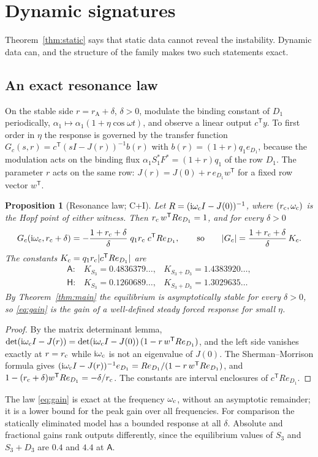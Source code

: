 \documentclass[11pt,a4paper]{article}
\theoremstyle{plain}
\newtheorem{proposition}[theorem]{Proposition}
\theoremstyle{definition}
\theoremstyle{remark}
\newcommand{\ii}{\mathrm i}
\newcommand{\T}{\mathsf T}
\newcommand{\rA}{r_{\mathrm A}}
\newcommand{\WA}{\mathsf A}
\newcommand{\WH}{\mathsf H}
\newcommand{\evC}{\textsf{C}}
\newcommand{\evI}{\textsf{I}}
\begin{document}
\section{Dynamic signatures}\label{sec:measure}
Theorem~\ref{thm:static} says that static data cannot reveal the instability. Dynamic data can, and the structure of the family makes two such statements exact.

\subsection{An exact resonance law}
On the stable side $r=\rA+\delta$, $\delta>0$, modulate the binding constant of $D_1$ periodically, $\alpha_1\mapsto\alpha_1(1+\eta\cos\omega t)$, and observe a linear output $c^{\T}y$. To first order in $\eta$ the response is governed by the transfer function $G_c(s,r)=c^{\T}(sI-J(r))^{-1}b(r)$ with $b(r)=(1+r)q_1e_{D_1}$, because the modulation acts on the binding flux $\alpha_1S_1^*F^*=(1+r)q_1$ of the row $D_1$. The parameter $r$ acts on the same row: $J(r)=J(0)+r\,e_{D_1}w^{\T}$ for a fixed row vector $w^{\T}$.

\begin{proposition}[Resonance law; \evC+\evI]\label{prop:gain}
Let $R=(\ii\omega_{\rm c}I-J(0))^{-1}$, where $(r_{\rm c},\omega_{\rm c})$ is the Hopf point of either witness. Then $r_{\rm c}\,w^{\T}Re_{D_1}=1$, and for every $\delta>0$
\begin{equation}\label{eq:gain}
 G_c(\ii\omega_{\rm c},r_{\rm c}+\delta)=-\frac{1+r_{\rm c}+\delta}{\delta}\;q_1r_{\rm c}\;c^{\T}Re_{D_1},
\qquad\text{so}\qquad |G_c|=\frac{1+r_{\rm c}+\delta}{\delta}\,K_c .
\end{equation}
The constants $K_c=q_1r_{\rm c}|c^{\T}Re_{D_1}|$ are
\[
\begin{array}{lll}
 \WA:& K_{S_3}=0.4836379\ldots,& K_{S_3+D_3}=1.4383920\ldots,\\
 \WH:& K_{S_3}=0.1260689\ldots,& K_{S_3+D_3}=1.3029635\ldots
\end{array}
\]
By Theorem~\ref{thm:main} the equilibrium is asymptotically stable for every $\delta>0$, so \eqref{eq:gain} is the gain of a well-defined steady forced response for small $\eta$.
\end{proposition}
\begin{proof}
By the matrix determinant lemma, $\det(\ii\omega_{\rm c}I-J(r))=\det(\ii\omega_{\rm c}I-J(0))\,(1-r\,w^{\T}Re_{D_1})$, and the left side vanishes exactly at $r=r_{\rm c}$ while $\ii\omega_{\rm c}$ is not an eigenvalue of $J(0)$. The Sherman--Morrison formula gives $(\ii\omega_{\rm c}I-J(r))^{-1}e_{D_1}=Re_{D_1}/(1-r\,w^{\T}Re_{D_1})$, and $1-(r_{\rm c}+\delta)w^{\T}Re_{D_1}=-\delta/r_{\rm c}$. The constants are interval enclosures of $c^{\T}Re_{D_1}$.
\end{proof}
The law \eqref{eq:gain} is exact at the frequency $\omega_{\rm c}$, without an asymptotic remainder; it is a lower bound for the peak gain over all frequencies. For comparison the statically eliminated model has a bounded response at all $\delta$. Absolute and fractional gains rank outputs differently, since the equilibrium values of $S_3$ and $S_3+D_3$ are $0.4$ and $4.4$ at $\WA$.
\end{document}
